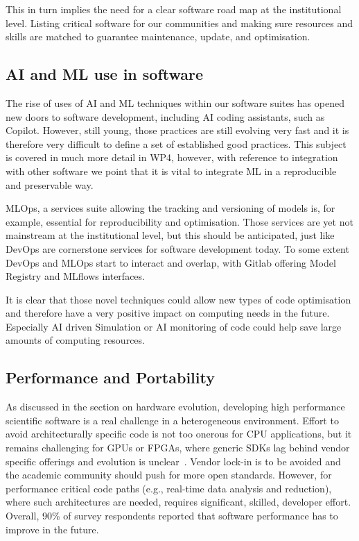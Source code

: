 This in turn implies the need for a clear software road map at the institutional level. Listing critical software for our communities and making sure resources and skills are matched to guarantee maintenance, update, and optimisation.

\subsection{AI and ML use in software}

The rise of uses of AI and ML techniques within our software suites has opened new doors to software development, including AI coding assistants, such as Copilot. However, still young, those practices are still evolving very fast and it is therefore very difficult to define a set of established good practices. This subject is covered in much more detail in WP4, however, with reference to integration with other software we point that it is vital to integrate ML in a reproducible and preservable way.

MLOps, a services suite allowing the tracking and versioning of models is, for example, essential for reproducibility and optimisation. Those services are yet not mainstream at the institutional level, but this should be anticipated, just like DevOps are cornerstone services for software development today. To some extent DevOps and MLOps start to interact and overlap, with Gitlab offering Model Registry and MLflows interfaces.

It is clear that those novel techniques could allow new types of code optimisation and therefore have a very positive impact on computing needs in the future. Especially AI driven Simulation or AI monitoring of code could help save large amounts of computing resources.


\subsection{Performance and Portability}

As discussed in the section on hardware evolution, developing high performance scientific software is a real challenge in a heterogeneous environment. Effort to avoid architecturally specific code is not too onerous for CPU applications, but it remains challenging for GPUs or FPGAs, where generic SDKs lag behind vendor specific offerings and evolution is unclear~\cite{atif2023evaluatingportableparallelizationstrategies}. Vendor lock-in is to be avoided and the academic community should push for more open standards. However, for performance critical code paths (e.g., real-time data analysis and reduction), where such architectures are needed, requires significant, skilled, developer effort. Overall, 90\% of survey respondents reported that software performance has to improve in the future.

